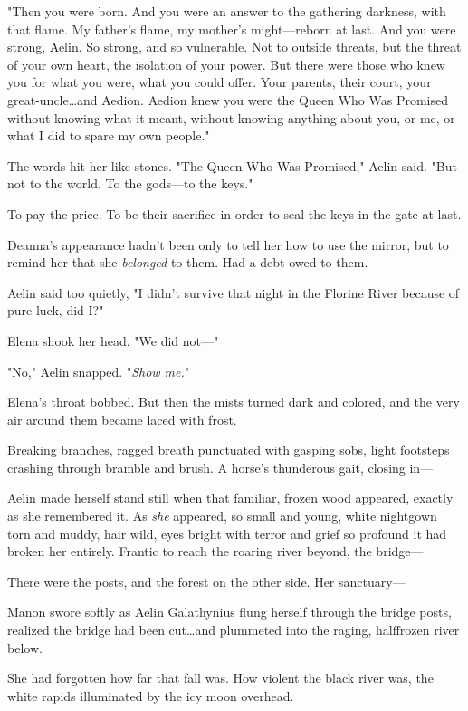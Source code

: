 "Then you were born.
And you were an answer to the gathering darkness, with that flame.
My father's flame, my mother's might---reborn at last.
And you were strong, Aelin.
So strong, and so vulnerable.
Not to outside threats, but the threat of your own heart, the isolation of your power.
But there were those who knew you for what you were, what you could offer.
Your parents, their court, your great-uncle\ldots and Aedion.
Aedion knew you were the Queen Who Was Promised without knowing what it meant, without knowing anything about you, or me, or what I did to spare my own people."

The words hit her like stones.
"The Queen Who Was Promised," Aelin said.
"But not to the world.
To the gods---to the keys."

To pay the price.
To be their sacrifice in order to seal the keys in the gate at last.

Deanna's appearance hadn't been only to tell her how to use the mirror, but to remind her that she \emph{belonged} to them.
Had a debt owed to them.

Aelin said too quietly, "I didn't survive that night in the Florine River because of pure luck, did I?"

Elena shook her head.
"We did not---"

"No," Aelin snapped.
"\emph{Show me.}"

Elena's throat bobbed.
But then the mists turned dark and colored, and the very air around them became laced with frost.

Breaking branches, ragged breath punctuated with gasping sobs, light footsteps crashing through bramble and brush.
A horse's thunderous gait, closing in---

Aelin made herself stand still when that familiar, frozen wood appeared, exactly as she remembered it.
As \emph{she} appeared, so small and young, white nightgown torn and muddy, hair wild, eyes bright with terror and grief so profound it had broken her entirely.
Frantic to reach the roaring river beyond, the bridge---

There were the posts, and the forest on the other side.
Her sanctuary---

Manon swore softly as Aelin Galathynius flung herself through the bridge posts, realized the bridge had been cut\ldots and plummeted into the raging, halffrozen river below.

She had forgotten how far that fall was.
How violent the black river was, the white rapids illuminated by the icy moon overhead.

